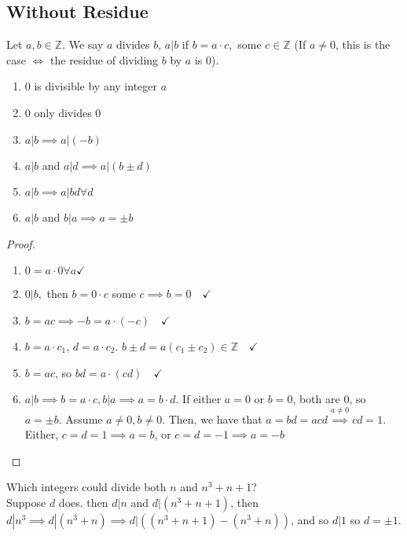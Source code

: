\documentclass[12pt,oneside]{article}
\begin{document}
\subsection{Without Residue}

\begin{definition}
  Let $a,b \in \mathbb{Z}$. We say $a$ divides $b$, $a|b$ if $b = a \cdot c,$ some $c \in \mathbb{Z}$ (If $a \neq 0$, this is the case $\iff$ the residue of dividing $b$ by $a$ is 0).
\end{definition}

\begin{lemma}\label{lemma:propertiesofdivison}
  \begin{enumerate}
    \item $0$ is divisible by any integer $a$
    \item $0$ only divides $0$
    \item $a|b \implies a|(-b)$
    \item $a|b$ and $a|d \implies a|(b\pm d)$
    \item $a|b \implies a|bd \forall d$
    \item $a|b$ and $b|a \implies a =\pm b$
  \end{enumerate}
\end{lemma}

\begin{proof}
  \begin{enumerate}
    \item $0 = a\cdot 0 \forall a \checkmark$
    \item $0 | b,$ then $b = 0 \cdot c$ some $c \implies b = 0\quad \checkmark$
    \item $b = ac \implies -b = a \cdot (-c) \quad\checkmark$
    \item $b = a\cdot c_1$, $d = a \cdot c_2$. $b \pm d = a(c_1 \pm c_2) \in \mathbb{Z} \quad\checkmark$
    \item $b = ac$, so $bd = a \cdot (cd) \quad\checkmark$
    \item $a | b \implies b = a \cdot c, b |a \implies a = b \cdot d$. If either $a = 0$ or $b = 0$, both are $0$, so $a = \pm b$. Assume $a \neq 0, b \neq 0$. Then, we have that $a = bd = acd \overset{a \neq 0}{\implies} cd = 1$. Either, $c = d = 1 \implies a = b$, or $c = d = -1 \implies a = -b$ \quad \checkmark
  \end{enumerate}
\end{proof}

\begin{example}
  Which integers could divide both $n$ and $n^3 + n + 1$?\\
  Suppose $d$ does. then $d | n$ and $d | (n^3 + n + 1)$, then $d | n^3 \implies d |(n^3 + n) \implies d | ((n^3 + n + 1) - (n^3 +n))$, and so $d|1$ so $d = \pm 1$.
\end{example}
\end{document}
